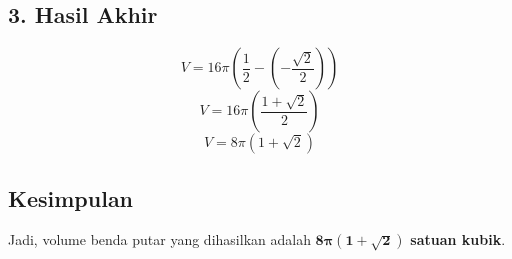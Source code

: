 \subsection*{3. Hasil Akhir}
\[ V = 16\pi \left( \frac{1}{2} - \left( -\frac{\sqrt{2}}{2} \right) \right) \]
\[ V = 16\pi \left( \frac{1 + \sqrt{2}}{2} \right) \]
\[ V = 8\pi (1 + \sqrt{2}) \]

\subsection*{Kesimpulan}
Jadi, volume benda putar yang dihasilkan adalah $\mathbf{8\pi (1 + \sqrt{2})}$ \textbf{satuan kubik}.

